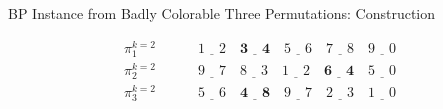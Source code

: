 \documentclass[xcolor=table]{beamer} %
\theoremstyle{definition}
\theoremstyle{plain}
\theoremstyle{remark}
\begin{document}
\begin{frame}{BP Instance from Badly Colorable Three Permutations: Construction}
    
\begin{minipage}
\linewidth
\tiny
\begin{equation*}\label{fig:33}
\begin{aligned}
\pi_1^{k=2} \qquad \quad \underline{1 \quad 2} \quad \underline{\mathbf{3 \quad 4}} \quad \underline{5 \quad 6} \quad \underline{7 \quad 8} \quad \underline{9 \quad 0} \\
\pi_2^{k=2} \qquad  \quad \underline{9 \quad 7} \quad \underline{8 \quad 3} \quad \underline{1 \quad 2} \quad \underline{\mathbf{6 \quad 4}} \quad \underline{5 \quad 0} \\
\pi_3^{k=2} \qquad \quad \underline{5 \quad 6} \quad \underline{\mathbf{4 \quad 8}} \quad \underline{9 \quad 7} \quad \underline{2 \quad 3} \quad \underline{1 \quad 0}
\end{aligned}
\end{equation*}
\end{minipage}



\end{frame}
\end{document}
